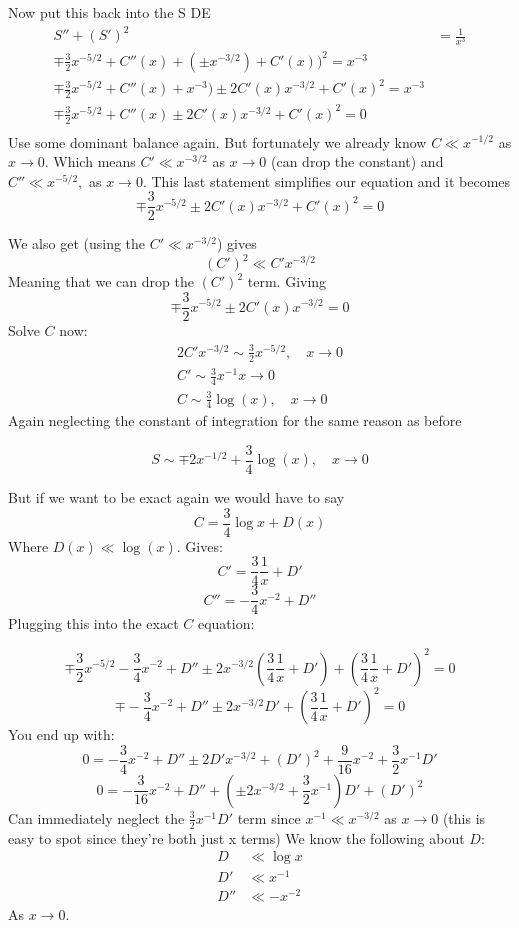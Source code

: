 \documentclass{X:/Documents/Coding/Latex/myassignment}
\begin{document}
Now put this back into the S DE
\begin{align*}
S'' + (S')^2 &= \frac1{x^3}\\
\mp \frac32 x^{-5/2} + C''(x) + (\pm x^{-3/2}) + C'(x))^2 = x^{-3}\\
\mp \frac32 x^{-5/2} + C''(x) + x^{-3}) \pm 2 C'(x)x^{-3/2} + C'(x)^2 = x^{-3}\\
\mp \frac32 x^{-5/2} + C''(x) \pm 2 C'(x)x^{-3/2} + C'(x)^2 = 0\\
\end{align*}
Use some dominant balance again. But fortunately we already know $C \ll x^{-1/2}$ as $x\to0$.
Which means $C' \ll x^{-3/2}$ as $x\to0$ (can drop the constant) and $C'' \ll x^{-5/2},$ as $x\to 0$.
This last statement simplifies our equation and it becomes
\[\mp \frac32 x^{-5/2} \pm 2 C'(x)x^{-3/2} + C'(x)^2 = 0\]

We also get (using the $C'\ll x^{-3/2}$) gives
\[(C')^2 \ll C' x^{-3/2}\]
Meaning that we can drop the $(C')^2$ term. Giving
\[\mp \frac32 x^{-5/2} \pm 2 C'(x)x^{-3/2} = 0\]
Solve $C$ now:
\begin{align*}
	2C' x^{-3/2} \sim \frac32 x^{-5/2}, \quad x\to 0\\
	C' \sim \frac34 x^{-1} x\to 0\\
	C \sim \frac34 \log(x), \quad x\to 0
\end{align*}
Again neglecting the constant of integration for the same reason as before

\[S\sim \mp 2x^{-1/2} + \frac34 \log(x), \quad x\to 0\]

But if we want to be exact again we would have to say
\[C = \frac34 \log x + D(x)\]
Where $D(x) \ll \log(x)$.
Gives:
\[C' = \frac34 \frac1x + D'\]
\[C''= -\frac34 x^{-2} + D''\]
Plugging this into the exact $C$ equation:

\[\mp \frac32 x^{-5/2}  -\frac34 x^{-2} + D'' \pm 2x^{-3/2} (\frac34 \frac1x + D') + (\frac34 \frac1x + D')^2 = 0\]
\[\mp  -\frac34 x^{-2} + D'' \pm 2x^{-3/2} D' + (\frac34 \frac1x + D')^2 = 0\]
You end up with:
\[0 = - \frac34 x^{-2} + D'' \pm 2D 'x^{-3/2} + (D')^2 + \frac{9}{16} x^{-2} + \frac32 x^{-1}D' \]
\[0= -\frac3{16} x^{-2} + D'' + (\pm2x ^{-3/2} + \frac32 x^{-1})D' + (D')^2\]
Can immediately neglect the $\frac32 x^{-1} D'$ term since $x^{-1} \ll x^{-3/2}$ as $x\to 0$ (this is easy to spot since they're both just x terms)
We know the following about $D$:
\begin{align*}
    D &\ll \log x\\
    D' &\ll x^{-1}\\
    D'' &\ll -x^{-2}
\end{align*}
As $x\to 0$.
\end{document}
